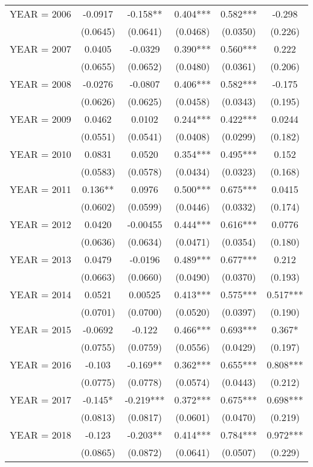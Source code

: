 \begin{tabular}{lccccc}
YEAR = 2006 & -0.0917 & -0.158** & 0.404*** & 0.582*** & -0.298 \\
 & (0.0645) & (0.0641) & (0.0468) & (0.0350) & (0.226) \\
YEAR = 2007 & 0.0405 & -0.0329 & 0.390*** & 0.560*** & 0.222 \\
 & (0.0655) & (0.0652) & (0.0480) & (0.0361) & (0.206) \\
YEAR = 2008 & -0.0276 & -0.0807 & 0.406*** & 0.582*** & -0.175 \\
 & (0.0626) & (0.0625) & (0.0458) & (0.0343) & (0.195) \\
YEAR = 2009 & 0.0462 & 0.0102 & 0.244*** & 0.422*** & 0.0244 \\
 & (0.0551) & (0.0541) & (0.0408) & (0.0299) & (0.182) \\
YEAR = 2010 & 0.0831 & 0.0520 & 0.354*** & 0.495*** & 0.152 \\
 & (0.0583) & (0.0578) & (0.0434) & (0.0323) & (0.168) \\
YEAR = 2011 & 0.136** & 0.0976 & 0.500*** & 0.675*** & 0.0415 \\
 & (0.0602) & (0.0599) & (0.0446) & (0.0332) & (0.174) \\
YEAR = 2012 & 0.0420 & -0.00455 & 0.444*** & 0.616*** & 0.0776 \\
 & (0.0636) & (0.0634) & (0.0471) & (0.0354) & (0.180) \\
YEAR = 2013 & 0.0479 & -0.0196 & 0.489*** & 0.677*** & 0.212 \\
 & (0.0663) & (0.0660) & (0.0490) & (0.0370) & (0.193) \\
YEAR = 2014 & 0.0521 & 0.00525 & 0.413*** & 0.575*** & 0.517*** \\
 & (0.0701) & (0.0700) & (0.0520) & (0.0397) & (0.190) \\
YEAR = 2015 & -0.0692 & -0.122 & 0.466*** & 0.693*** & 0.367* \\
 & (0.0755) & (0.0759) & (0.0556) & (0.0429) & (0.197) \\
YEAR = 2016 & -0.103 & -0.169** & 0.362*** & 0.655*** & 0.808*** \\
 & (0.0775) & (0.0778) & (0.0574) & (0.0443) & (0.212) \\
YEAR = 2017 & -0.145* & -0.219*** & 0.372*** & 0.675*** & 0.698*** \\
 & (0.0813) & (0.0817) & (0.0601) & (0.0470) & (0.219) \\
YEAR = 2018 & -0.123 & -0.203** & 0.414*** & 0.784*** & 0.972*** \\
 & (0.0865) & (0.0872) & (0.0641) & (0.0507) & (0.229) \\

\end{tabular}
